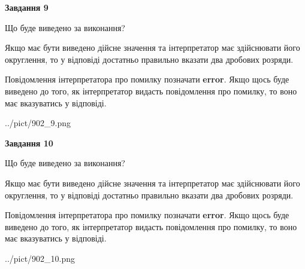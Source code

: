 \documentclass[12pt, ukrainian]{article}
\begin{document}
{\begin {Large}
{\begin {center}\textbf{Завдання 9}\end {center}}\par
Що буде виведено за виконання? \par

Якщо має бути виведено дійсне значення та інтерпретатор має здійснювати його округлення, 
то у відповіді достатньо правильно вказати два дробових розряди.

Повідомлення інтерпретатора про помилку позначати \textbf{error}.
Якщо щось буде виведено до того, як інтерпретатор видасть повідомлення про помилку, 
то воно має вказуватись у відповіді. \par

\begin{center}
	{../pict/902_9.png}
\end{center}
\newpage

{\begin {center}\textbf{Завдання 10}\end {center}}\par
Що буде виведено за виконання? \par

Якщо має бути виведено дійсне значення та інтерпретатор має здійснювати його округлення, 
то у відповіді достатньо правильно вказати два дробових розряди.

Повідомлення інтерпретатора про помилку позначати \textbf{error}.
Якщо щось буде виведено до того, як інтерпретатор видасть повідомлення про помилку, 
то воно має вказуватись у відповіді. \par

\begin{center}
	{../pict/902_10.png}
\end{center}
\newpage

\end {Large}}
\end{document}

